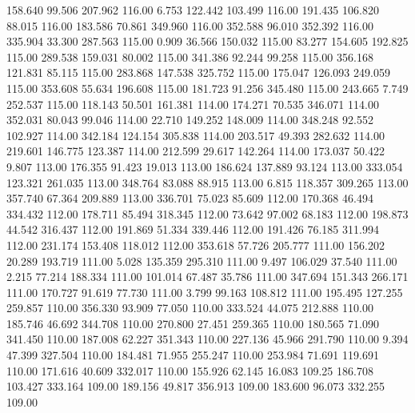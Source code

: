  158.640   99.506  207.962       116.00
   6.753  122.442  103.499       116.00
 191.435  106.820   88.015       116.00
 183.586   70.861  349.960       116.00
 352.588   96.010  352.392       116.00
 335.904   33.300  287.563       115.00
   0.909   36.566  150.032       115.00
  83.277  154.605  192.825       115.00
 289.538  159.031   80.002       115.00
 341.386   92.244   99.258       115.00
 356.168  121.831   85.115       115.00
 283.868  147.538  325.752       115.00
 175.047  126.093  249.059       115.00
 353.608   55.634  196.608       115.00
 181.723   91.256  345.480       115.00
 243.665    7.749  252.537       115.00
 118.143   50.501  161.381       114.00
 174.271   70.535  346.071       114.00
 352.031   80.043   99.046       114.00
  22.710  149.252  148.009       114.00
 348.248   92.552  102.927       114.00
 342.184  124.154  305.838       114.00
 203.517   49.393  282.632       114.00
 219.601  146.775  123.387       114.00
 212.599   29.617  142.264       114.00
 173.037   50.422    9.807       113.00
 176.355   91.423   19.013       113.00
 186.624  137.889   93.124       113.00
 333.054  123.321  261.035       113.00
 348.764   83.088   88.915       113.00
   6.815  118.357  309.265       113.00
 357.740   67.364  209.889       113.00
 336.701   75.023   85.609       112.00
 170.368   46.494  334.432       112.00
 178.711   85.494  318.345       112.00
  73.642   97.002   68.183       112.00
 198.873   44.542  316.437       112.00
 191.869   51.334  339.446       112.00
 191.426   76.185  311.994       112.00
 231.174  153.408  118.012       112.00
 353.618   57.726  205.777       111.00
 156.202   20.289  193.719       111.00
   5.028  135.359  295.310       111.00
   9.497  106.029   37.540       111.00
   2.215   77.214  188.334       111.00
 101.014   67.487   35.786       111.00
 347.694  151.343  266.171       111.00
 170.727   91.619   77.730       111.00
   3.799   99.163  108.812       111.00
 195.495  127.255  259.857       110.00
 356.330   93.909   77.050       110.00
 333.524   44.075  212.888       110.00
 185.746   46.692  344.708       110.00
 270.800   27.451  259.365       110.00
 180.565   71.090  341.450       110.00
 187.008   62.227  351.343       110.00
 227.136   45.966  291.790       110.00
   9.394   47.399  327.504       110.00
 184.481   71.955  255.247       110.00
 253.984   71.691  119.691       110.00
 171.616   40.609  332.017       110.00
 155.926   62.145   16.083       109.25
 186.708  103.427  333.164       109.00
 189.156   49.817  356.913       109.00
 183.600   96.073  332.255       109.00
